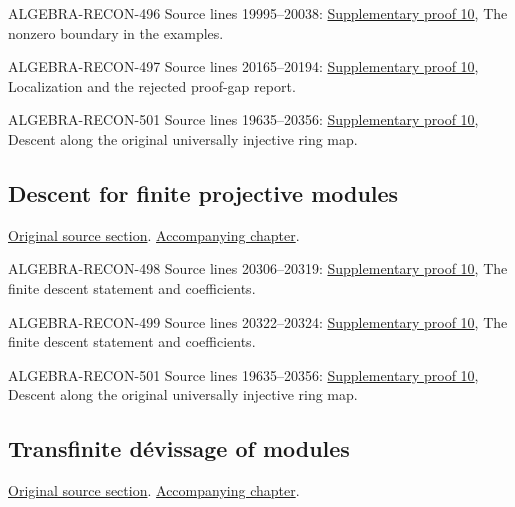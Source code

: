 \begin{AlgebraSourceRoutes}
\item[ALGEBRA-RECON-496] Source lines 19995--20038: \hyperlink{algebra_open_loci_pure_descent_notes_20260927}{Supplementary proof 10}, The nonzero boundary in the examples.
\item[ALGEBRA-RECON-497] Source lines 20165--20194: \hyperlink{algebra_open_loci_pure_descent_notes_20260927}{Supplementary proof 10}, Localization and the rejected proof-gap report.
\item[ALGEBRA-RECON-501] Source lines 19635--20356: \hyperlink{algebra_open_loci_pure_descent_notes_20260927}{Supplementary proof 10}, Descent along the original universally injective ring map.
\end{AlgebraSourceRoutes}

\subsection{Descent for finite projective modules}
\hypertarget{algebra-source-section-finite-projective}{}
\noindent\href{https://github.com/stacks/stacks-project/blob/a04446e57ec1fbc252a871afcec7752fb2807b14/algebra.tex\#L20274}{Original source section}. \href{algebra.pdf\#nameddest=section-finite-projective}{Accompanying chapter}.

\begin{AlgebraSourceRoutes}
\item[ALGEBRA-RECON-498] Source lines 20306--20319: \hyperlink{algebra_open_loci_pure_descent_notes_20260927}{Supplementary proof 10}, The finite descent statement and coefficients.
\item[ALGEBRA-RECON-499] Source lines 20322--20324: \hyperlink{algebra_open_loci_pure_descent_notes_20260927}{Supplementary proof 10}, The finite descent statement and coefficients.
\item[ALGEBRA-RECON-501] Source lines 19635--20356: \hyperlink{algebra_open_loci_pure_descent_notes_20260927}{Supplementary proof 10}, Descent along the original universally injective ring map.
\end{AlgebraSourceRoutes}

\subsection{Transfinite d\'evissage of modules}
\hypertarget{algebra-source-section-transfinite-devissage}{}
\noindent\href{https://github.com/stacks/stacks-project/blob/a04446e57ec1fbc252a871afcec7752fb2807b14/algebra.tex\#L20374}{Original source section}. \href{algebra.pdf\#nameddest=section-transfinite-devissage}{Accompanying chapter}.

